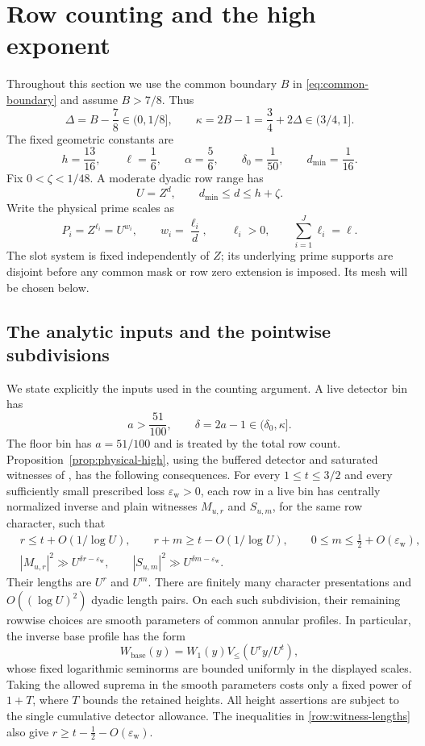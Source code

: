\documentclass[11pt,a4paper]{article}
\numberwithin{equation}{section}
\theoremstyle{definition}
\theoremstyle{remark}
\newcommand{\eps}{\varepsilon}
\begin{document}
\section{Row counting and the high exponent}
\label{sec:rows}

Throughout this section we use the common boundary \(B\) in
\eqref{eq:common-boundary} and assume \(B>7/8\).  Thus
\[
 \Delta=B-\frac78\in(0,1/8],\qquad
 \kappa=2B-1=\frac34+2\Delta\in(3/4,1].
\]
The fixed geometric constants are
\begin{equation}\label{row:constants}
 h=\frac{13}{16},\qquad \ell=\frac16,\qquad
 \alpha=\frac56,\qquad \delta_0=\frac1{50},\qquad
 d_{\min}=\frac1{16}.
\end{equation}
Fix \(0<\zeta<1/48\).  A moderate dyadic row range has
\[
 U=Z^d,\qquad d_{\min}\le d\le h+\zeta.
\]
Write the physical prime scales as
\[
 P_i=Z^{\ell_i}=U^{w_i},\qquad
 w_i=\frac{\ell_i}{d},\qquad
 \ell_i>0,\qquad \sum_{i=1}^{J}\ell_i=\ell.
\]
The slot system is fixed independently of \(Z\); its underlying prime
supports are disjoint before any common mask or row zero extension is
imposed.  Its mesh will be chosen below.

\subsection{The analytic inputs and the pointwise subdivisions}
\label{row:inputs}

We state explicitly the inputs used in the counting argument.  A live
detector bin has
\[
 a>\frac{51}{100},\qquad
 \delta=2a-1\in(\delta_0,\kappa].
\]
The floor bin has \(a=51/100\) and is treated by the total row count.
Proposition~\ref{prop:physical-high}, using the buffered detector and
saturated witnesses of \cite[Lemmas 8.1--8.2 and Proposition 8.3]{Q},
has the following consequences.  For every \(1\le t\le3/2\) and every sufficiently small
prescribed loss \(\eps_{\mathrm w}>0\), each row in a live bin has
centrally normalized inverse and plain witnesses \(M_{u,r}\) and
\(S_{u,m}\), for the same row character, such that
\begin{align}
 &r\le t+O(1/\log U),\qquad
 r+m\ge t-O(1/\log U),\qquad
 0\le m\le\tfrac12+O(\eps_{\mathrm w}),\label{row:witness-lengths}\\
 &|M_{u,r}|^2\gg U^{\delta r-\eps_{\mathrm w}},\qquad
 |S_{u,m}|^2\gg U^{\delta m-\eps_{\mathrm w}}.
 \label{row:witness-spikes}
\end{align}
Their lengths are \(U^r\) and \(U^m\).  There are finitely many character
presentations and \(O((\log U)^2)\) dyadic length pairs.  On each such
subdivision, their remaining rowwise choices are smooth parameters of
common annular profiles.  In particular, the inverse base profile has
the form
\[
 W_{\mathrm{base}}(y)=W_1(y)V_{\le}(U^r y/U^t),
\]
whose fixed logarithmic seminorms are bounded uniformly in the displayed
scales.  Taking the allowed suprema in the smooth parameters costs only
a fixed power of \(1+T\), where \(T\) bounds the retained heights.  All
height assertions are subject to the single cumulative detector
allowance.  
The inequalities in \eqref{row:witness-lengths} also give
\(r\ge t-\tfrac12-O(\eps_{\mathrm w})\).
\end{document}
